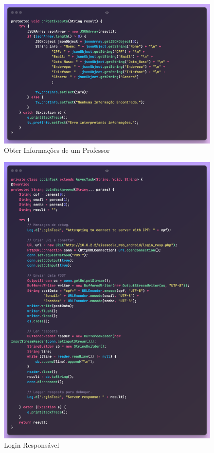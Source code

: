 \documentclass[main.tex]{subfiles}
\begin{document}
\begin{figure}[H]
    \centering
    \includegraphics[scale=0.6]{imagens/code_scrs/11-obterProfInfo}
    \caption{Obter Informações de um Professor}
\end{figure}

\begin{figure}[H]
    \centering
    \includegraphics[scale=0.63]{imagens/code_scrs/9-loginResp}
    \caption{Login Responsável}
\end{figure}
\end{document}
